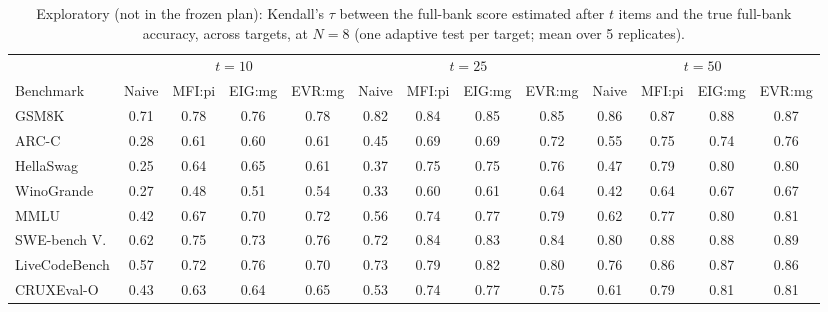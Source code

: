 \begin{table}[tbp]
\centering\scriptsize
\caption{Exploratory (not in the frozen plan): Kendall's $\tau$ between the full-bank score estimated after $t$ items and the true full-bank accuracy, across targets, at $N=8$ (one adaptive test per target; mean over 5 replicates).}
\label{tab:ranking}
\setlength{\tabcolsep}{2.0pt}
\begin{tabular}{@{}lcccccccccccc@{}}
\toprule
 & \multicolumn{4}{c}{$t=10$} & \multicolumn{4}{c}{$t=25$} & \multicolumn{4}{c}{$t=50$} \\
\cmidrule(lr){2-5}\cmidrule(lr){6-9}\cmidrule(lr){10-13}
Benchmark & Naive & MFI:pi & EIG:mg & EVR:mg & Naive & MFI:pi & EIG:mg & EVR:mg & Naive & MFI:pi & EIG:mg & EVR:mg \\
\midrule
GSM8K & 0.71 & 0.78 & 0.76 & 0.78 & 0.82 & 0.84 & 0.85 & 0.85 & 0.86 & 0.87 & 0.88 & 0.87 \\
ARC-C & 0.28 & 0.61 & 0.60 & 0.61 & 0.45 & 0.69 & 0.69 & 0.72 & 0.55 & 0.75 & 0.74 & 0.76 \\
HellaSwag & 0.25 & 0.64 & 0.65 & 0.61 & 0.37 & 0.75 & 0.75 & 0.76 & 0.47 & 0.79 & 0.80 & 0.80 \\
WinoGrande & 0.27 & 0.48 & 0.51 & 0.54 & 0.33 & 0.60 & 0.61 & 0.64 & 0.42 & 0.64 & 0.67 & 0.67 \\
MMLU & 0.42 & 0.67 & 0.70 & 0.72 & 0.56 & 0.74 & 0.77 & 0.79 & 0.62 & 0.77 & 0.80 & 0.81 \\
SWE-bench V. & 0.62 & 0.75 & 0.73 & 0.76 & 0.72 & 0.84 & 0.83 & 0.84 & 0.80 & 0.88 & 0.88 & 0.89 \\
LiveCodeBench & 0.57 & 0.72 & 0.76 & 0.70 & 0.73 & 0.79 & 0.82 & 0.80 & 0.76 & 0.86 & 0.87 & 0.86 \\
CRUXEval-O & 0.43 & 0.63 & 0.64 & 0.65 & 0.53 & 0.74 & 0.77 & 0.75 & 0.61 & 0.79 & 0.81 & 0.81 \\
\bottomrule
\end{tabular}
\end{table}
